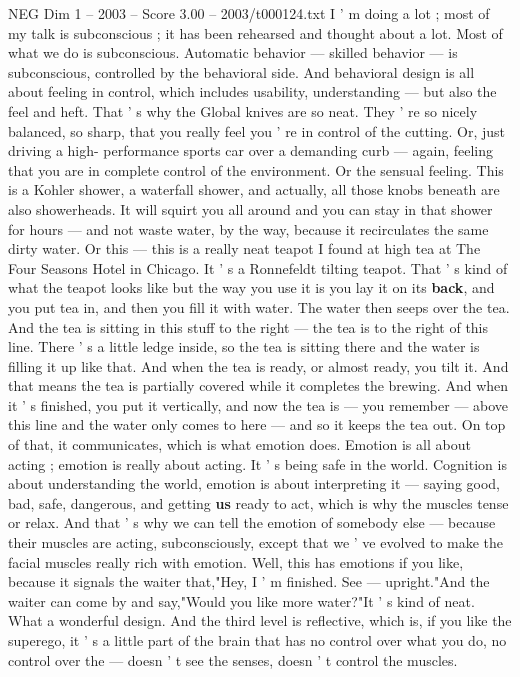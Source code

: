 \begin{textsample}{NEG Dim 1 – 2003 – Score 3.00 – 2003/t000124.txt}
I ' m doing a lot ; most of my talk is subconscious ; it has been rehearsed and thought about a lot.
Most of what we do is subconscious.
Automatic behavior — skilled behavior — is subconscious, controlled by the behavioral side.
And behavioral design is all about feeling in control, which includes usability, understanding — but also the feel and heft.
That ' s why the Global knives are so neat.
They ' re so nicely balanced, so sharp, that you really feel you ' re in control of the cutting.
Or, just driving a high- performance sports car over a demanding curb — again, feeling that you are in complete control of the environment.
Or the sensual feeling.
This is a Kohler shower, a waterfall shower, and actually, all those knobs beneath are also showerheads.
It will squirt you all around and you can stay in that shower for hours — and not waste water, by the way, because it recirculates the same dirty water.
Or this — this is a really neat teapot I found at high tea at The Four Seasons Hotel in Chicago.
It ' s a Ronnefeldt tilting teapot.
That ' s kind of what the teapot looks like but the way you use it is you lay it on its \textbf{back}, and you put tea in, and then you fill it with water.
The water then seeps over the tea.
And the tea is sitting in this stuff to the right — the tea is to the right of this line.
There ' s a little ledge inside, so the tea is sitting there and the water is filling it up like that.
And when the tea is ready, or almost ready, you tilt it.
And that means the tea is partially covered while it completes the brewing.
And when it ' s finished, you put it vertically, and now the tea is — you remember — above this line and the water only comes to here — and so it keeps the tea out.
On top of that, it communicates, which is what emotion does.
Emotion is all about acting ; emotion is really about acting.
It ' s being safe in the world.
Cognition is about understanding the world, emotion is about interpreting it — saying good, bad, safe, dangerous, and getting \textbf{us} ready to act, which is why the muscles tense or relax.
And that ' s why we can tell the emotion of somebody else — because their muscles are acting, subconsciously, except that we ' ve evolved to make the facial muscles really rich with emotion.
Well, this has emotions if you like, because it signals the waiter that,"Hey, I ' m finished.
See — upright."And the waiter can come by and say,"Would you like more water?"It ' s kind of neat.
What a wonderful design.
And the third level is reflective, which is, if you like the superego, it ' s a little part of the brain that has no control over what you do, no control over the — doesn ' t see the senses, doesn ' t control the muscles.

\end{textsample}
